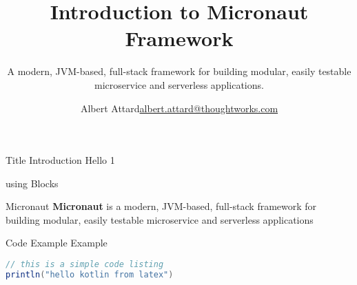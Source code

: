 \documentclass{beamer}
\title[Micronaut]{Introduction to Micronaut Framework}
\subtitle{A modern, JVM-based, full-stack framework for building modular, easily testable microservice and serverless applications.}
\author{\texorpdfstring{Albert Attard\newline\url{albert.attard@thoughtworks.com}}{Albert Attard}}
\institute{\large \href{https://thoughtworks.com}{\textbf{ThoughtWorks}.com}}
\date{}
\begin{document}

    \begin{frame}
        \titlepage
    \end{frame}


    \begin{frame}[t]{Title Introduction}
        Hello 1
    \end{frame}

    \begin{frame}[t]{using Blocks}
        \begin{block}{Micronaut}
        \textbf{Micronaut} is a modern, JVM-based, full-stack framework for building modular, easily testable microservice and serverless applications
        \end{block}
    \end{frame}

    \begin{frame}[t,fragile]{Code Example}
        Example
        \begin{lstlisting}[language=Java]
// this is a simple code listing
println("hello kotlin from latex")
        \end{lstlisting}
    \end{frame}
\end{document}
